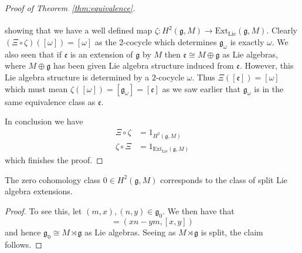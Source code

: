 \begin{proof}[Proof of Theorem~\ref{thm:equivalence}]
\[\begin{tikzcd}
  \end{tikzcd}\]
  showing that we have a well defined map $ \zeta: H^2(\mathfrak{g}, M) \to \text{Ext}_{\text{Lie}}(\mathfrak{g}, M) $. Clearly $ (\Xi \circ \zeta)([\omega]) = [\omega] $ as the 2-cocycle which determines $ \mathfrak{g}_{\omega} $ is exactly $ \omega $. We also seen that if $ \mathfrak{e} $ is an extension of $ \mathfrak{g} $ by $ M $ then $ \mathfrak{e} \cong M \oplus \mathfrak{g} $ as Lie algebras, where $ M \oplus \mathfrak{g} $ has been given Lie algebra structure induced from $ \mathfrak{e} $. However, this Lie algebra structure is determined by a $ 2 $-cocycle $ \omega $. Thus $ \Xi ([\mathfrak{e}]) = [\omega] $ which must mean $ \zeta([\omega])=[\mathfrak{g}_\omega] = [\mathfrak{e}] $ as we saw earlier that $ \mathfrak{g}_\omega $ is in the same equivalence class as $ \mathfrak{e} $.

  In conclusion we have
  \begin{align*}
    \Xi \circ \zeta &= 1_{H^2(\mathfrak{g}, M)} \\
    \zeta \circ \Xi &= 1_{\text{Ext}_{\text{Lie}} (\mathfrak{g}, M)}
  \end{align*}
  which finishes the proof.
\end{proof}

\begin{corollary}
  The zero cohomology class $ 0 \in H^2(\mathfrak{g}, M) $ corresponds to the class of split Lie algebra extensions.
\end{corollary}
\begin{proof}
  To see this, let $ (m, x), (n, y) \in \mathfrak{g}_{0} $. We then have that
  \begin{equation}
    [(m, x), (n, y)] = (xn - ym, [x, y])
  \end{equation}
  and hence $ \mathfrak{g}_{0}\cong M \rtimes \mathfrak{g} $ as Lie algebras. Seeing as $ M \rtimes \mathfrak{g} $ is split, the claim follows.
\end{proof}
